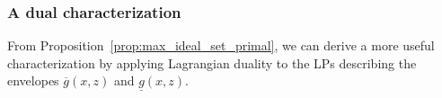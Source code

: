 \documentclass[smallextended]{svjour3}
\newcommand{\tx}{\widetilde{x}}
\newcommand{\Sideal}{S_{\operatorname{ideal}}}
\newcommand{\ubar}[1]{\underline{#1}}
\renewcommand{\bar}[1]{\overline{#1}}
\begin{document}

\subsubsection{A dual characterization}\label{sec:ideal_dual}

From Proposition~\ref{prop:max_ideal_set_primal}, we can derive a more useful characterization by applying Lagrangian duality to the LPs describing the envelopes $\bar{g}(x,z)$ and $\ubar{g}(x,z)$.


\end{document}
